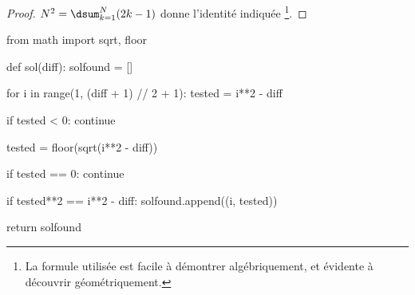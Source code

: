 \begin{proof}
	$N^2 = \dsum_{k=1}^{N} (2 k - 1)$ donne l'identité indiquée
	\footnote{
		La formule utilisée est facile à démontrer algébriquement, et évidente à découvrir géométriquement.
	}.
\end{proof}



\newpage
\bgroup
\small
\begin{Python}
from math import sqrt, floor

def sol(diff):
    solfound = []

    for i in range(1, (diff + 1) // 2 + 1):
        tested = i**2 - diff

        if tested < 0:
            continue

        tested = floor(sqrt(i**2 - diff))

        if tested == 0:
            continue

        if tested**2 == i**2 - diff:
            solfound.append((i, tested))

    return solfound
\end{Python}
\egroup	
